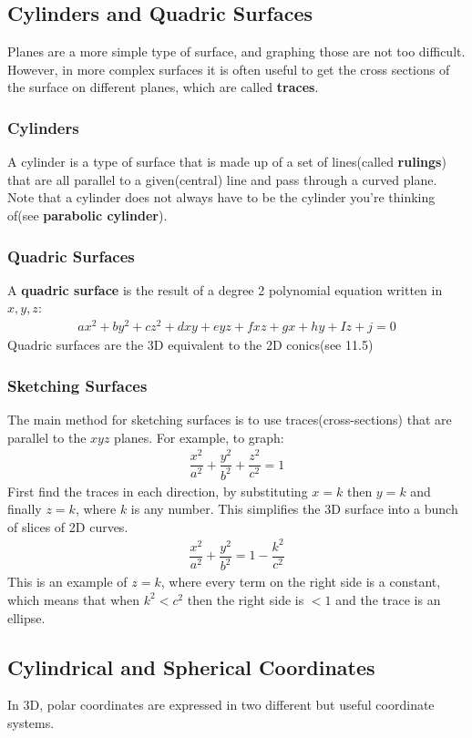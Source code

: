 \documentclass{article}
\begin{document}
\subsection{Cylinders and Quadric Surfaces}
Planes are a more simple type of surface, and graphing those are not too difficult. However, in more complex surfaces it is often useful to get the cross sections of the surface on different planes, which are called \textbf{traces}.
\subsubsection{Cylinders}
A cylinder is a type of surface that is made up of a set of lines(called \textbf{rulings}) that are all parallel to a given(central) line and pass through a curved plane. Note that a cylinder does not always have to be the cylinder you're thinking of(see \textbf{parabolic cylinder}).
\subsubsection{Quadric Surfaces}
A \textbf{quadric surface} is the result of a degree 2 polynomial equation written in $x,y,z$:
\begin{gather*}
    ax^2 + by^2 + cz^2 + dxy + eyz + fxz + gx + hy + Iz + j = 0
\end{gather*}
Quadric surfaces are the 3D equivalent to the 2D conics(see 11.5)
\subsubsection{Sketching Surfaces}
The main method for sketching surfaces is to use traces(cross-sections) that are parallel to the $xyz$ planes. For example, to graph:
\begin{gather*}
    \dfrac{x^2}{a^2} + \dfrac{y^2}{b^2} + \dfrac{z^2}{c^2} = 1
\end{gather*}
First find the traces in each direction, by substituting $x=k$ then $y=k$ and finally $z=k$, where $k$ is any number. This simplifies the 3D surface into a bunch of slices of 2D curves.
\begin{gather*}
    \dfrac{x^2}{a^2} + \dfrac{y^2}{b^2} = 1 - \dfrac{k^2}{c^2}
\end{gather*}
This is an example of $z = k$, where every term on the right side is a constant, which means that when $k^2 < c^2$ then the right side is $< 1$ and the trace is an ellipse.
\subsection{Cylindrical and Spherical Coordinates}
In 3D, polar coordinates are expressed in two different but useful coordinate systems.
\end{document}
